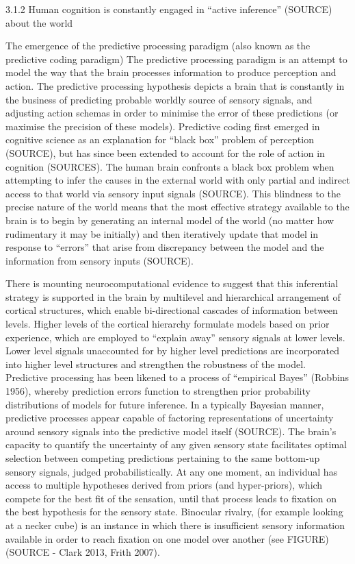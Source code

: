 3.1.2 Human cognition is constantly engaged in ``active inference'' (SOURCE) about the world

The emergence of the predictive processing paradigm (also known as the predictive coding paradigm)
    The predictive processing paradigm is an attempt to model the way that the brain processes information to produce perception and action. The predictive processing hypothesis depicts a brain that is constantly in the business of predicting probable worldly source of sensory signals, and adjusting action schemas in order to minimise the error of these predictions (or maximise the precision of these models). Predictive coding first emerged in cognitive science as an explanation for ``black box'' problem of perception (SOURCE), but has since been extended to account for the role of action in cognition (SOURCES). The human brain confronts a black box problem when attempting to infer the causes in the external world with only partial and indirect access to that world via sensory input signals (SOURCE). This blindness to the precise nature of the world means that the most effective strategy available to the brain is to begin by generating an internal model of the world (no matter how rudimentary it may be initially) and then iteratively update that model in response to ``errors'' that arise from discrepancy between the model and the information from sensory inputs (SOURCE).

    There is mounting neurocomputational evidence to suggest that this inferential strategy is supported in the brain by multilevel and hierarchical arrangement of cortical structures, which enable bi-directional cascades of information between levels.  Higher levels of the cortical hierarchy formulate models based on prior experience, which are employed to ``explain away'' sensory signals at lower levels. Lower level signals unaccounted for by higher level predictions are incorporated into higher level structures and strengthen the robustness of the model.  Predictive processing has been likened to a process of ``empirical Bayes'' (Robbins 1956), whereby prediction errors function to strengthen prior probability distributions of models for future inference.  In a typically Bayesian manner, predictive processes appear capable of factoring representations of uncertainty around sensory signals into the predictive model itself (SOURCE).  The brain's capacity to quantify the uncertainty of any given sensory state facilitates optimal selection between competing predictions pertaining to the same bottom-up sensory signals, judged probabilistically.  At any one moment, an individual has access to multiple hypotheses derived from priors (and hyper-priors), which compete for the best fit of the sensation, until that process leads to fixation on the best hypothesis for the sensory state. Binocular rivalry, (for example looking at a necker cube) is an instance in which there is insufficient sensory information available in order to reach fixation on one model over another (see FIGURE) (SOURCE - Clark 2013, Frith 2007).

